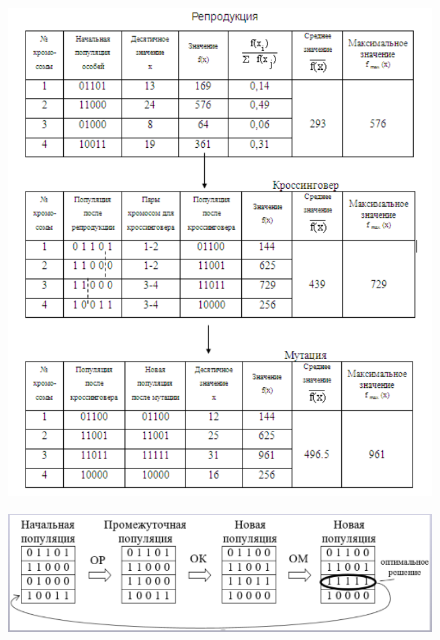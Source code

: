 \documentclass{beamer}
\begin{document}
\begin{frame}
\begin{figure}[h]
\centering
\includegraphics[scale=0.4]{images/lec04-pic12.png}
\end{figure}
\end{frame}

\begin{frame}
\begin{figure}[h]
\centering
\includegraphics[scale=0.45]{images/lec04-pic13.png}
\end{figure}
\end{frame}
\end{document}
